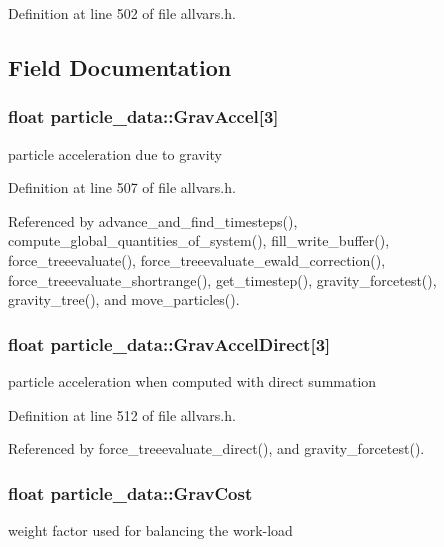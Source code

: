 Definition at line 502 of file allvars.h.



\subsection{Field Documentation}
\hypertarget{structparticle__data_a601ab390c85cd05a5c965e3353d403f3}{
\subsubsection[{GravAccel}]{\setlength{\rightskip}{0pt plus 5cm}float {\bf particle\_\-data::GravAccel}\mbox{[}3\mbox{]}}}
\label{structparticle__data_a601ab390c85cd05a5c965e3353d403f3}
particle acceleration due to gravity 

Definition at line 507 of file allvars.h.



Referenced by advance\_\-and\_\-find\_\-timesteps(), compute\_\-global\_\-quantities\_\-of\_\-system(), fill\_\-write\_\-buffer(), force\_\-treeevaluate(), force\_\-treeevaluate\_\-ewald\_\-correction(), force\_\-treeevaluate\_\-shortrange(), get\_\-timestep(), gravity\_\-forcetest(), gravity\_\-tree(), and move\_\-particles().

\hypertarget{structparticle__data_ae4d6efa44515e66a9b7806d8d57a88bf}{
\subsubsection[{GravAccelDirect}]{\setlength{\rightskip}{0pt plus 5cm}float {\bf particle\_\-data::GravAccelDirect}\mbox{[}3\mbox{]}}}
\label{structparticle__data_ae4d6efa44515e66a9b7806d8d57a88bf}
particle acceleration when computed with direct summation 

Definition at line 512 of file allvars.h.



Referenced by force\_\-treeevaluate\_\-direct(), and gravity\_\-forcetest().

\hypertarget{structparticle__data_a2f34828ae7803611a4e86bb201697317}{
\subsubsection[{GravCost}]{\setlength{\rightskip}{0pt plus 5cm}float {\bf particle\_\-data::GravCost}}}
\label{structparticle__data_a2f34828ae7803611a4e86bb201697317}
weight factor used for balancing the work-\/load 

